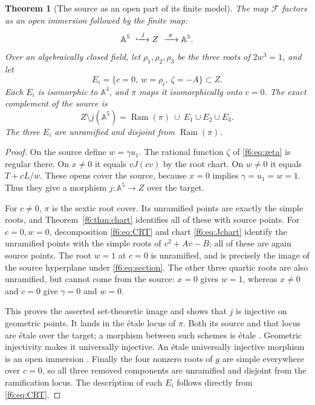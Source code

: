 \documentclass[11pt,a4paper]{article}
\newtheorem{theorem}{Theorem}[section]
\theoremstyle{definition}
\newcommand{\A}{\mathbb A}
\newcommand{\Ram}{\operatorname{Ram}}
\newcommand{\F}{\mathcal F}
\begin{document}
\begin{theorem}[The source as an open part of its finite model]
\label{f6:thm:boundary}
The map $\F$ factors as an open immersion followed by the finite map:
\[
 \A^5\ \xhookrightarrow{\ j\ } Z\ \xrightarrow{\ \pi\ }\A^5.
\]
Over an algebraically closed field, let $\rho_1,\rho_2,\rho_3$ be the
three roots of $2w^3=1$, and let
\[
 E_i=\{c=0,\ w=\rho_i,\ \zeta=-A\}\subset Z.
\]
Each $E_i$ is isomorphic to $\A^4$, and $\pi$ maps it isomorphically onto
$c=0$. The exact complement of the source is
\begin{equation}\label{f6:eq:boundary}
 Z\setminus j(\A^5)=\Ram(\pi)\ \cup\ E_1\cup E_2\cup E_3.
\end{equation}
The three $E_i$ are unramified and disjoint from $\Ram(\pi)$.
\end{theorem}
\begin{proof}
On the source define $w=\gamma u_1$. The rational function $\zeta$ of
\eqref{f6:eq:zeta} is regular there. On $x\ne0$ it equals $vJ(cv)$ by the
root chart. On $w\ne0$ it equals $T+cL/w$. These opens cover the source,
because $x=0$ implies $\gamma=u_1=w=1$. Thus they give a morphism
$j:\A^5\to Z$ over the target.

For $c\ne0$, $\pi$ is the sextic root cover. Its unramified points are
exactly the simple roots, and Theorem~\ref{f6:thm:chart} identifies all of
these with source points. For $c=0,w=0$, decomposition
\eqref{f6:eq:CRT} and chart \eqref{f6:eq:Jchart} identify the unramified points
with the simple roots of $v^2+Av-B$; all of these are again source points.
The root $w=1$ at $c=0$ is unramified, and is precisely the image of the
source hyperplane under \eqref{f6:eq:section}. The other three quartic roots
are also unramified, but cannot come from the source: $x=0$ gives $w=1$,
whereas $x\ne0$ and $c=0$ give $\gamma=0$ and $w=0$.

This proves the asserted set-theoretic image and shows that $j$ is
injective on geometric points. It lands in the \'etale locus of $\pi$.
Both its source and that locus are \'etale over the target; a morphism
between such schemes is \'etale \cite[Tag 02GH]{StacksEtale}. Geometric
injectivity makes it universally injective. An \'etale universally
injective morphism is an open immersion \cite[Tag 025G]{StacksOpen}.
Finally the four nonzero roots of $g$ are simple everywhere over $c=0$,
so all three removed components are unramified and disjoint from the
ramification locus. The description of each $E_i$ follows directly from
\eqref{f6:eq:CRT}.
\end{proof}
\end{document}
